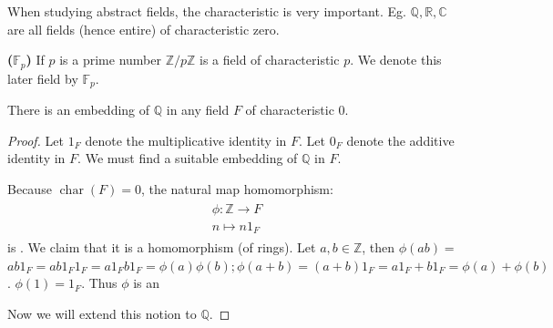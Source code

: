 \documentclass{article}
\newcommand{\bfs}[1]{\textbf{({#1}) }}
\begin{document}
\begin{exma}
When studying abstract fields, the characteristic is very important.
Eg. $\mathbb{Q}, \mathbb{R}, \mathbb{C}$ are all fields (hence entire) of characteristic zero.
\end{exma} 
\begin{defa}\bfs{$\mathbb{F}_{p}$}
If $p$ is a prime number $\mathbb{Z} / p \mathbb{Z}$ is a field of characteristic $p$. We denote this later field by $\mathbb{F}_{p}$.
\end{defa}
\begin{thma}
There is an embedding of $\mathbb{Q}$ in any field $F$ of characteristic $0 .$
\end{thma}
\begin{proof}
 Let $1_{F}$ denote the multiplicative identity in $F$. Let $0_{F}$ denote the additive identity in $F$. We must find a suitable embedding of $\mathbb{Q}$ in $F$. 
 
 Because $\operatorname{char}(F)=0$, the natural map homomorphism:
\begin{align*}
\begin{gathered}
\phi: \mathbb{Z} \rightarrow F \\
n \mapsto n 1_{F}
\end{gathered}
\end{align*}
is . We claim that it is a homomorphism (of rings). Let $a, b \in \mathbb{Z}$, then $\phi(a b)=$ $a b 1_{F}=a b 1_{F} 1_{F}=a 1_{F} b 1_{F}=\phi(a) \phi(b) ; \phi(a+b)=(a+b) 1_{F}=a 1_{F}+b 1_{F}=\phi(a)+\phi(b)$. $\phi(1)=1_{F}$. Thus $\phi$ is an 

 Now we will extend this notion to $\mathbb{Q}$. 


\end{proof}
\end{document}
